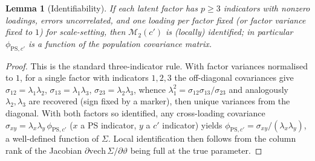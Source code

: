 \documentclass{amsart}
\newtheorem{lemma}{Lemma}
\theoremstyle{remark}
\begin{document}
\begin{lemma}[Identifiability]\label{lem:ident}
If each latent factor has $p\ge 3$ indicators with nonzero loadings, errors
uncorrelated, and one loading per factor fixed (or factor variance fixed to $1$)
for scale-setting, then $\mathcal M_2(c')$ is (locally) identified; in particular
$\phi_{\mathrm{PS},c'}$ is a function of the population covariance matrix.
\end{lemma}
\begin{proof}
This is the standard three-indicator rule. With factor variances normalised to
$1$, for a single factor with indicators $1,2,3$ the off-diagonal covariances give
$\sigma_{12}=\lambda_1\lambda_2$, $\sigma_{13}=\lambda_1\lambda_3$,
$\sigma_{23}=\lambda_2\lambda_3$, whence
$\lambda_1^2=\sigma_{12}\sigma_{13}/\sigma_{23}$ and analogously $\lambda_2,\lambda_3$
are recovered (sign fixed by a marker), then unique variances from the diagonal.
With both factors so identified, any cross-loading covariance
$\sigma_{x y}=\lambda_x\lambda_y\,\phi_{\mathrm{PS},c'}$ ($x$ a PS indicator, $y$ a
$c'$ indicator) yields $\phi_{\mathrm{PS},c'}=\sigma_{xy}/(\lambda_x\lambda_y)$, a
well-defined function of $\Sigma$. Local identification then follows from the
column rank of the Jacobian $\partial\mathrm{vech}\,\Sigma/\partial\vartheta$ being
full at the true parameter. \end{proof}
\end{document}
